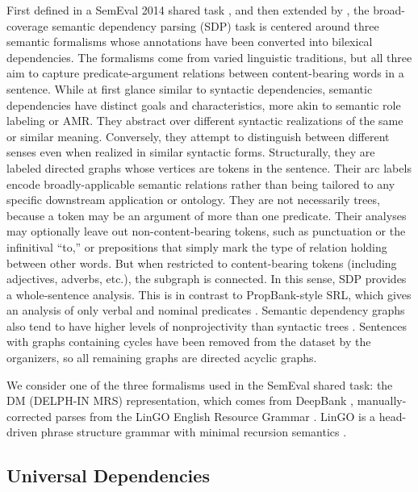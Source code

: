 \documentclass[11pt,a4paper]{article}
\begin{document}
First defined in a SemEval 2014 shared task
\cite{oepen2014semeval}, and then extended by \citet{oepen2015semeval},
the broad-coverage semantic dependency parsing (SDP) task is centered around three
semantic formalisms whose annotations have been
converted into bilexical dependencies. The formalisms come
from varied linguistic traditions, but all three aim
to capture predicate-argument relations between
content-bearing words in a sentence.
While at first glance similar to syntactic dependencies,
semantic dependencies have distinct
goals and characteristics, more akin to semantic
role labeling \cite[SRL; ][]{gildea2002automatic} or
AMR. They abstract over different
syntactic realizations of the same or similar meaning.
Conversely, they attempt to distinguish
between different senses even when realized
in similar syntactic forms.
Structurally, they are labeled directed graphs
whose vertices are tokens in the sentence.
Their arc labels encode broadly-applicable semantic relations rather than being tailored
to any specific downstream application or
ontology.
They are not necessarily trees, because
a token may be an argument of more than one
predicate. Their analyses may optionally leave out non-content-bearing
tokens, such as punctuation or the infinitival ``to,'' or prepositions that simply mark
the type of relation holding between other words.
But when restricted to content-bearing tokens (including
adjectives, adverbs, etc.), the subgraph
is connected. In this sense, SDP provides a
whole-sentence analysis. This is in contrast to
PropBank-style SRL, which gives an analysis of
only verbal and nominal predicates \cite{Palmer:05}.
Semantic dependency graphs also tend to
have higher levels of nonprojectivity than syntactic
trees \cite{oepen2014semeval}. Sentences with
graphs containing cycles have been removed from
the dataset by the organizers, so all remaining
graphs are directed acyclic graphs.

We consider one of the three formalisms used in the SemEval shared task:
the DM (DELPH-IN MRS) representation, which comes
from DeepBank \cite{flickinger2012deepbank},
manually-corrected parses from the LinGO
English Resource Grammar \cite{copestake2000open}.
LinGO is a head-driven phrase
structure grammar \cite[HPSG; ][]{pollard1994head}
with minimal recursion semantics \cite{copestake2005minimal}.

\subsection{Universal Dependencies}\label{sec:ud}
\end{document}
